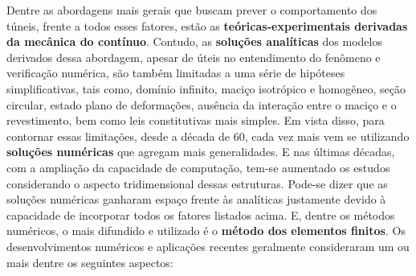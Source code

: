 Dentre as abordagens mais gerais que buscam prever o comportamento dos túneis, frente a todos esses fatores, estão as \textbf{teóricas-experimentais derivadas da mecânica do contínuo}. Contudo, as \textbf{soluções analíticas} dos modelos derivados dessa abordagem, apesar de úteis no entendimento do fenômeno e verificação numérica, são também limitadas a uma série de hipóteses simplificativas, tais como, domínio infinito, maciço isotrópico e homogêneo, seção circular, estado plano de deformações, ausência da interação entre o maciço e o revestimento, bem como leis constitutivas mais simples. Em vista disso, para contornar essas limitações, desde a década de 60, cada vez mais vem se utilizando \textbf{soluções numéricas} que agregam mais generalidades. E nas últimas décadas, com a ampliação da capacidade de computação, tem-se aumentado os estudos considerando o aspecto tridimensional dessas estruturas. Pode-se dizer que as soluções numéricas ganharam espaço frente às analíticas justamente devido à capacidade de incorporar todos os fatores listados acima. E, dentre os métodos numéricos, o mais difundido e utilizado é o \textbf{método dos elementos finitos}. Os desenvolvimentos numéricos e aplicações recentes geralmente consideraram um ou mais dentre os seguintes aspectos:

